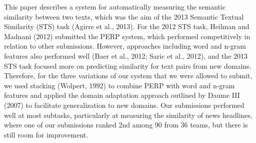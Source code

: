 This paper describes a system for automatically measuring the semantic similarity between two texts, which was the aim of the 2013 Semantic Textual
 Similarity (STS) task (Agirre et al., 2013). For the 2012 STS task, Heilman and
 Madnani (2012) submitted the PERP system, which performed competitively in
 relation to other submissions. However, approaches including word and n-gram
 features also performed well (Baer et al., 2012; Saric et al., 2012), and the
 2013 STS task focused more on predicting similarity for text pairs from new
 domains. Therefore, for the three variations of our system that we were allowed
 to submit, we used stacking (Wolpert, 1992) to combine PERP with word and
 n-gram features and applied the domain adaptation approach outlined by Daume
 III (2007) to facilitate generalization to new domains. Our submissions
 performed well at most subtasks, particularly at measuring the similarity of
 news headlines, where one of our submissions ranked 2nd among 90 from 36 teams,
 but there is still room for improvement.

